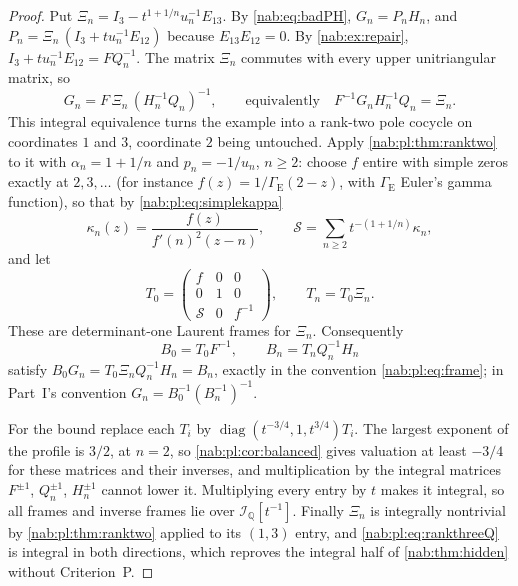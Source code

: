 \documentclass[11pt,letterpaper]{article}
\theoremstyle{definition}
\theoremstyle{remark}
\newcommand{\Q}{\mathbb Q}
\numberwithin{equation}{section}
\begin{document}
\begin{proof}
Put $\Xi_n=I_3-t^{1+1/n}u_n^{-1}E_{13}$. By \eqref{nab:eq:badPH},
$G_n=P_nH_n$, and $P_n=\Xi_n\,(I_3+tu_n^{-1}E_{12})$ because $E_{13}E_{12}=0$.
By \cref{nab:ex:repair}, $I_3+tu_n^{-1}E_{12}=FQ_n^{-1}$. The matrix $\Xi_n$
commutes with every upper unitriangular matrix, so
\begin{equation}\label{nab:pl:eq:rankthreeQ}
 G_n=F\,\Xi_n\,(H_n^{-1}Q_n)^{-1},\qquad
 \text{equivalently}\quad F^{-1}G_nH_n^{-1}Q_n=\Xi_n .
\end{equation}
This integral equivalence turns the example into a rank-two pole cocycle on
coordinates $1$ and $3$, coordinate $2$ being untouched. Apply
\cref{nab:pl:thm:ranktwo} to it with $\alpha_n=1+1/n$ and $p_n=-1/u_n$,
$n\geq2$: choose $f$ entire with simple zeros exactly at $2,3,\ldots$ (for
instance $f(z)=1/\Gamma_{\mathrm{E}}(2-z)$, with $\Gamma_{\mathrm E}$ Euler's
gamma function), so that by \eqref{nab:pl:eq:simplekappa}
\[
 \kappa_n(z)=\frac{f(z)}{f'(n)^2(z-n)},\qquad
 \mathcal S=\sum_{n\geq2}t^{-(1+1/n)}\kappa_n,
\]
and let
\begin{equation}\label{nab:pl:eq:T0three}
 T_0=\begin{pmatrix}f&0&0\\0&1&0\\ \mathcal S&0&f^{-1}\end{pmatrix},\qquad
 T_n=T_0\Xi_n .
\end{equation}
These are determinant-one Laurent frames for $\Xi_n$. Consequently
\begin{equation}\label{nab:pl:eq:Boriginal}
 B_0=T_0F^{-1},\qquad B_n=T_nQ_n^{-1}H_n
\end{equation}
satisfy $B_0G_n=T_0\Xi_nQ_n^{-1}H_n=B_n$, exactly in the convention
\eqref{nab:pl:eq:frame}; in Part~I's convention $G_n=B_0^{-1}(B_n^{-1})^{-1}$.

For the bound replace each $T_i$ by $\operatorname{diag}(t^{-3/4},1,t^{3/4})T_i$.
The largest exponent of the profile is $3/2$, at $n=2$, so
\cref{nab:pl:cor:balanced} gives valuation at least $-3/4$ for these matrices
and their inverses, and multiplication by the integral matrices $F^{\pm1}$,
$Q_n^{\pm1}$, $H_n^{\pm1}$ cannot lower it. Multiplying every entry by $t$ makes
it integral, so all frames and inverse frames lie over
$\mathscr I_{\Q}[t^{-1}]$. Finally $\Xi_n$ is integrally nontrivial by
\cref{nab:pl:thm:ranktwo} applied to its $(1,3)$ entry, and
\eqref{nab:pl:eq:rankthreeQ} is integral in both directions, which reproves the
integral half of \cref{nab:thm:hidden} without Criterion~P.
\end{proof}
\end{document}
